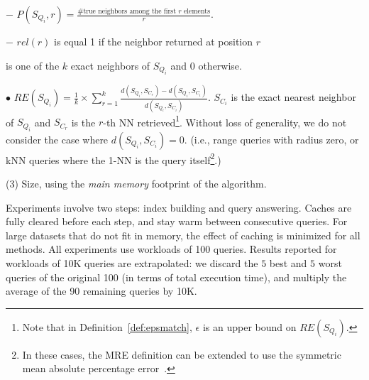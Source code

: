 {$-$  
$P({S_{Q_i}},r) = \frac {\text{\# true neighbors among the first $r$ elements}} {r}$.

$-$ $rel(r)$ is equal 1 if the neighbor returned at position $r$ 

is one of the $k$ exact neighbors of $S_{Q_i}$ and 0 otherwise.
	
\noindent$\bullet$  
$RE(S_{Q_i}) = \frac{1}{k} \times \sum_{r=1}^{k} \frac {d(S_{Q_i},S_{C_{r}}) - d(S_{Q_i},S_{C_i})} {d(S_{Q_i},S_{C_i})}$. 	
$S_{C_i}$ is the exact nearest neighbor of $S_{Q_i}$ and $S_{C_{r}}$ is the $r$-th NN retrieved\footnote{Note that in Definition~\ref{def:epsmatch}, $\epsilon$ is an upper bound on $RE(S_{Q_i})$.}.
Without loss of generality, we do not consider the case where $d(S_{Q_i},S_{C_i}) = 0$. 
(i.e., range queries with radius zero, or kNN queries where the 1-NN is the query itself\footnote{In these cases, the MRE definition can be extended to use the symmetric mean absolute percentage error~\cite{journal/omega/Flores1986}.}.) 



\noindent(3) Size, using the \emph{main memory} footprint of the algorithm.

Experiments involve two steps: index building and query answering. Caches are fully cleared before each step, and stay warm between consecutive queries.
For large datasets that do not fit in memory, the effect of caching is minimized for all methods. 
All experiments use workloads of 100 queries. 
Results reported for workloads of 10K queries are extrapolated: we discard the $5$ best and $5$ worst queries of the original 100 (in terms of total execution time), and multiply the average of the 90 remaining queries by 10K. 

}
